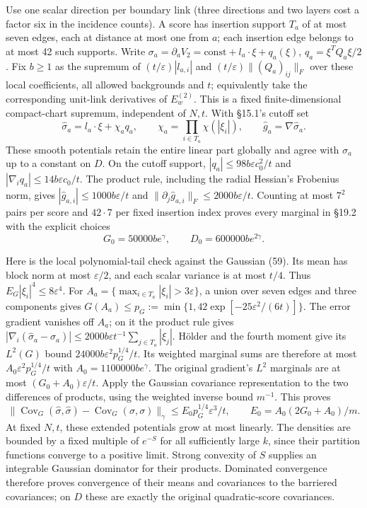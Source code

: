 \documentclass[11pt,a4paper]{article}
\begin{document}
Use one scalar direction per boundary link (three directions and two
layers cost a factor six in the incidence counts). A score has insertion
support \(T_a\) of at most seven edges, each at distance at most one
from \(a\); each insertion edge belongs to at most 42 such supports.
Write \(\sigma_a=\partial_aV_2=\mathrm{const}+l_a\cdot\xi+q_a(\xi)\),
\(q_a=\xi^TQ_a\xi/2\). Fix \(b\ge1\) as the supremum of
\((t/\varepsilon)|l_{a,i}|\) and \((t/\varepsilon)\|(Q_a)_{ij}\|_F\)
over these local coefficients, all allowed backgrounds and \(t\);
equivalently take the corresponding unit-link derivatives of
\(E_w^{(2)}\). This is a fixed finite-dimensional compact-chart
supremum, independent of \(N,t\). With §15.1's cutoff set
\[\widehat\sigma_a=l_a\cdot\xi+\chi_a q_a,\qquad
\chi_a=\prod_{i\in T_a}\chi(|\xi_i|),\qquad
\widehat g_a=\nabla\widehat\sigma_a.\tag{86}\] These smooth potentials
retain the entire linear part globally and agree with \(\sigma_a\) up to
a constant on \(D\). On the cutoff support,
\(|q_a|\le98b\varepsilon c_0^2/t\) and
\(|\nabla_iq_a|\le14b\varepsilon c_0/t\). The product rule, including
the radial Hessian's Frobenius norm, gives
\(|\widehat g_{a,i}|\le1000b\varepsilon/t\) and
\(\|\partial_j\widehat g_{a,i}\|_F\le2000b\varepsilon/t\). Counting at
most \(7^2\) pairs per score and \(42\cdot7\) per fixed insertion index
proves every marginal in §19.2 with the explicit choices
\[G_0=50000b e^\gamma,\qquad D_0=600000b e^{2\gamma}.\tag{87}\]

Here is the local polynomial-tail check against the Gaussian (59). Its
mean has block norm at most \(\varepsilon/2\), and each scalar variance
is at most \(t/4\). Thus \(E_G|\xi_i|^4\le8\varepsilon^4\). For
\(A_a=\{\max_{i\in T_a}|\xi_i|>3\varepsilon\}\), a union over seven
edges and three components gives
\(G(A_a)\le p_G:=\min\{1,42\exp[-25\varepsilon^2/(6t)]\}\). The error
gradient vanishes off \(A_a\); on it the product rule gives
\(|\nabla_i(\widehat\sigma_a-\sigma_a)| \le2000b\varepsilon t^{-1}\sum_{j\in T_a}|\xi_j|\).
Hölder and the fourth moment give its \(L^2(G)\) bound
\(24000b\varepsilon^2p_G^{1/4}/t\). Its weighted marginal sums are
therefore at most \(A_0\varepsilon^2p_G^{1/4}/t\) with
\(A_0=1100000b e^\gamma\). The original gradient's \(L^2\) marginals are
at most \((G_0+A_0)\varepsilon/t\). Apply the Gaussian covariance
representation to the two differences of products, using the weighted
inverse bound \(m^{-1}\). This proves
\[\|\operatorname{Cov}_G(\widehat\sigma,\widehat\sigma)
-\operatorname{Cov}_G(\sigma,\sigma)\|_\gamma
\le E_0p_G^{1/4}\varepsilon^3/t,\qquad
E_0=A_0(2G_0+A_0)/m.\tag{88}\] At fixed \(N,t\), these extended
potentials grow at most linearly. The densities are bounded by a fixed
multiple of \(e^{-S}\) for all sufficiently large \(k\), since their
partition functions converge to a positive limit. Strong convexity of
\(S\) supplies an integrable Gaussian dominator for their products.
Dominated convergence therefore proves convergence of their means and
covariances to the barriered covariances; on \(D\) these are exactly the
original quadratic-score covariances.
\end{document}
